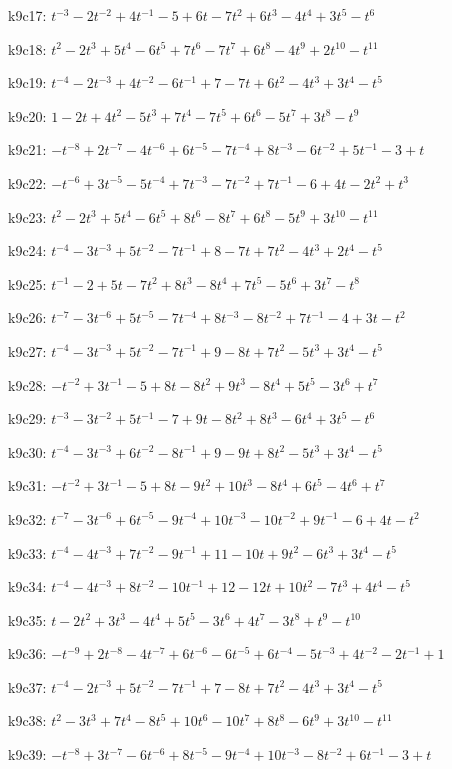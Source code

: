 k9c17: $t^{-3}-2t^{-2}+4t^{-1}-5+6t-7t^{2}+6t^{3}-4t^{4}+3t^{5}-t^{6}$

k9c18: $t^{2}-2t^{3}+5t^{4}-6t^{5}+7t^{6}-7t^{7}+6t^{8}-4t^{9}+2t^{10}-t^{11}$

k9c19: $t^{-4}-2t^{-3}+4t^{-2}-6t^{-1}+7-7t+6t^{2}-4t^{3}+3t^{4}-t^{5}$

k9c20: $1-2t+4t^{2}-5t^{3}+7t^{4}-7t^{5}+6t^{6}-5t^{7}+3t^{8}-t^{9}$

k9c21: $-t^{-8}+2t^{-7}-4t^{-6}+6t^{-5}-7t^{-4}+8t^{-3}-6t^{-2}+5t^{-1}-3+t$

k9c22: $-t^{-6}+3t^{-5}-5t^{-4}+7t^{-3}-7t^{-2}+7t^{-1}-6+4t-2t^{2}+t^{3}$

k9c23: $t^{2}-2t^{3}+5t^{4}-6t^{5}+8t^{6}-8t^{7}+6t^{8}-5t^{9}+3t^{10}-t^{11}$

k9c24: $t^{-4}-3t^{-3}+5t^{-2}-7t^{-1}+8-7t+7t^{2}-4t^{3}+2t^{4}-t^{5}$

k9c25: $t^{-1}-2+5t-7t^{2}+8t^{3}-8t^{4}+7t^{5}-5t^{6}+3t^{7}-t^{8}$

k9c26: $t^{-7}-3t^{-6}+5t^{-5}-7t^{-4}+8t^{-3}-8t^{-2}+7t^{-1}-4+3t-t^{2}$

k9c27: $t^{-4}-3t^{-3}+5t^{-2}-7t^{-1}+9-8t+7t^{2}-5t^{3}+3t^{4}-t^{5}$

k9c28: $-t^{-2}+3t^{-1}-5+8t-8t^{2}+9t^{3}-8t^{4}+5t^{5}-3t^{6}+t^{7}$

k9c29: $t^{-3}-3t^{-2}+5t^{-1}-7+9t-8t^{2}+8t^{3}-6t^{4}+3t^{5}-t^{6}$

k9c30: $t^{-4}-3t^{-3}+6t^{-2}-8t^{-1}+9-9t+8t^{2}-5t^{3}+3t^{4}-t^{5}$

k9c31: $-t^{-2}+3t^{-1}-5+8t-9t^{2}+10t^{3}-8t^{4}+6t^{5}-4t^{6}+t^{7}$

k9c32: $t^{-7}-3t^{-6}+6t^{-5}-9t^{-4}+10t^{-3}-10t^{-2}+9t^{-1}-6+4t-t^{2}$

k9c33: $t^{-4}-4t^{-3}+7t^{-2}-9t^{-1}+11-10t+9t^{2}-6t^{3}+3t^{4}-t^{5}$

k9c34: $t^{-4}-4t^{-3}+8t^{-2}-10t^{-1}+12-12t+10t^{2}-7t^{3}+4t^{4}-t^{5}$

k9c35: $t-2t^{2}+3t^{3}-4t^{4}+5t^{5}-3t^{6}+4t^{7}-3t^{8}+t^{9}-t^{10}$

k9c36: $-t^{-9}+2t^{-8}-4t^{-7}+6t^{-6}-6t^{-5}+6t^{-4}-5t^{-3}+4t^{-2}-2t^{-1}+1$

k9c37: $t^{-4}-2t^{-3}+5t^{-2}-7t^{-1}+7-8t+7t^{2}-4t^{3}+3t^{4}-t^{5}$

k9c38: $t^{2}-3t^{3}+7t^{4}-8t^{5}+10t^{6}-10t^{7}+8t^{8}-6t^{9}+3t^{10}-t^{11}$

k9c39: $-t^{-8}+3t^{-7}-6t^{-6}+8t^{-5}-9t^{-4}+10t^{-3}-8t^{-2}+6t^{-1}-3+t$

